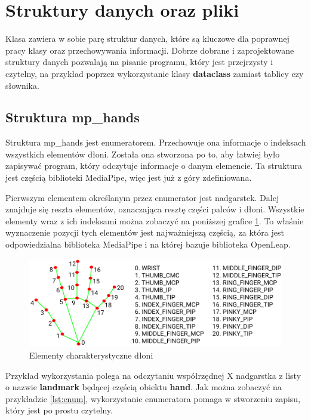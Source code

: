 \section{Struktury danych oraz pliki}

\quad Klasa zawiera w sobie parę struktur danych, które są kluczowe dla poprawnej pracy klasy oraz przechowywania informacji. Dobrze dobrane i zaprojektowane struktury danych pozwalają na pisanie programu, który jest przejrzysty i czytelny, na przykład poprzez wykorzystanie klasy \textbf{dataclass} zamiast tablicy czy słownika. 

\subsection{Struktura mp\_hands}

\quad Struktura mp\_hands jest enumeratorem. Przechowuje ona informacje o indeksach wszystkich elementów dłoni. Została ona stworzona po to, aby łatwiej było zapisywać program, który odczytuje informacje o danym elemencie. Ta struktura jest częścią biblioteki MediaPipe, więc jest już z góry zdefiniowana. 

\quad Pierwszym elementem określanym przez enumerator jest nadgarstek. Dalej znajduje się reszta elementów, oznaczająca resztę części palców i dłoni. Wszystkie elementy wraz z ich indeksami można zobaczyć na poniższej grafice \ref{img:hand_points}. To właśnie wyznaczenie pozycji tych elementów jest najważniejszą częścią, za która jest odpowiedzialna biblioteka MediaPipe i na której bazuje biblioteka OpenLeap. 

\begin{figure}[H]
    \begin{center}
        \includegraphics[width=12.8cm]{../images/hand_landmarks.png}
        \caption{Elementy charakterystyczne dłoni}
        \label{img:hand_points}
    \end{center}
\end{figure}

\quad Przykład wykorzystania polega na odczytaniu współrzędnej X nadgarstka z listy o nazwie \textbf{landmark} będącej częścią obiektu \textbf{hand}. Jak można zobaczyć na przykładzie \ref{lst:enum}, wykorzystanie enumeratora pomaga w stworzeniu zapisu, który jest po prostu czytelny. \newline

